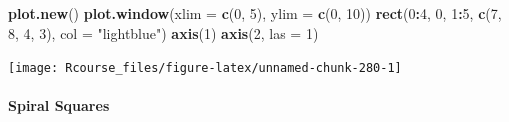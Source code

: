 \documentclass[]{book}
\newenvironment{Shaded}{\begin{snugshade}}{\end{snugshade}}
\newcommand{\KeywordTok}[1]{\textcolor[rgb]{0.13,0.29,0.53}{\textbf{#1}}}
\newcommand{\DataTypeTok}[1]{\textcolor[rgb]{0.13,0.29,0.53}{#1}}
\newcommand{\DecValTok}[1]{\textcolor[rgb]{0.00,0.00,0.81}{#1}}
\newcommand{\StringTok}[1]{\textcolor[rgb]{0.31,0.60,0.02}{#1}}
\newcommand{\OperatorTok}[1]{\textcolor[rgb]{0.81,0.36,0.00}{\textbf{#1}}}
\newcommand{\NormalTok}[1]{#1}
\let\oldparagraph\paragraph
\renewcommand{\paragraph}[1]{\oldparagraph{#1}\mbox{}}
\theoremstyle{definition}
\theoremstyle{definition}
\theoremstyle{definition}
\theoremstyle{remark}
\begin{document}
\begin{Shaded}
\begin{Highlighting}[]
\KeywordTok{plot.new}\NormalTok{()}
\KeywordTok{plot.window}\NormalTok{(}\DataTypeTok{xlim =} \KeywordTok{c}\NormalTok{(}\DecValTok{0}\NormalTok{, }\DecValTok{5}\NormalTok{), }\DataTypeTok{ylim =} \KeywordTok{c}\NormalTok{(}\DecValTok{0}\NormalTok{, }\DecValTok{10}\NormalTok{))}
\KeywordTok{rect}\NormalTok{(}\DecValTok{0}\OperatorTok{:}\DecValTok{4}\NormalTok{, }\DecValTok{0}\NormalTok{, }\DecValTok{1}\OperatorTok{:}\DecValTok{5}\NormalTok{, }\KeywordTok{c}\NormalTok{(}\DecValTok{7}\NormalTok{, }\DecValTok{8}\NormalTok{, }\DecValTok{4}\NormalTok{, }\DecValTok{3}\NormalTok{), }\DataTypeTok{col =} \StringTok{"lightblue"}\NormalTok{)}
\KeywordTok{axis}\NormalTok{(}\DecValTok{1}\NormalTok{)}
\KeywordTok{axis}\NormalTok{(}\DecValTok{2}\NormalTok{, }\DataTypeTok{las =} \DecValTok{1}\NormalTok{)}
\end{Highlighting}
\end{Shaded}

\texttt{[image: Rcourse\_files/figure-latex/unnamed-chunk-280-1]}

\paragraph{Spiral Squares}\label{spiral-squares}
\end{document}
